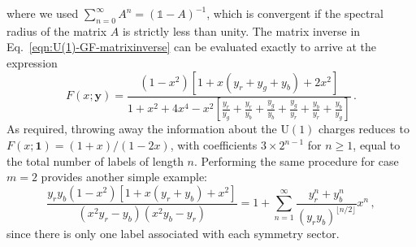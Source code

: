 %
%
where we used $\sum_{n=0}^\infty A^n = (\mathds{1} - A)^{-1}$, which is convergent if the spectral radius of the matrix $A$ is strictly less than unity. 
The matrix inverse in Eq.~\eqref{eqn:U(1)-GF-matrixinverse} can be evaluated exactly to arrive at the expression
%
%
\begin{equation}
      F(x; \mathbf{y} ) = \frac{\left(1-x^2\right) \left[ 1 + x (y_r+y_g+y_b)+2x^2\right]}{1+x^2+4 x^4  - x^2 \left[\frac{y_r}{y_g}+\frac{y_r}{y_b} + \frac{y_g}{y_b}+\frac{y_g}{y_r} + \frac{y_b}{y_r} + \frac{y_b}{y_g}\right]}
      \, .
\end{equation}
%
%
As required, throwing away the information about the $\text{U}(1)$ charges reduces to $F(x; \mathbf{1}) = (1+x)/(1-2x)$, with coefficients $3 \times 2^{n-1}$ for $n \geq 1$, equal to the total number of labels of length $n$. Performing the same procedure for case $m=2$ provides another simple example:
%
%
\begin{equation}
    \frac{y_r y_b\left(1-x^2\right)  \left[ 1+x (y_r+y_b) + x^2\right]}{ \left(x^2 y_r-y_b\right) \left(x^2 y_b-y_r\right) } = 
    1+\sum_{n=1}^{\infty} \frac{y_r^n + y_b^n}{(y_r y_b)^{\lfloor n/2 \rfloor}} x^n
    \, ,
\end{equation}
%
%
since there is only one label associated with each symmetry sector.

